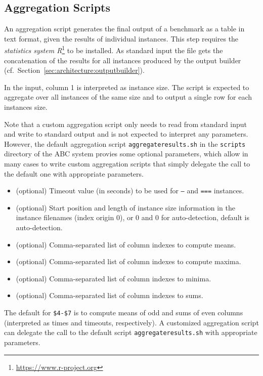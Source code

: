 \documentclass[a4paper]{article}
\newcommand{\abcs}{{ABC}}
\begin{document}
		\subsection{Aggregation Scripts}
		\label{sec:architecture:aggregate}

			An aggregation script
		    generates the final output of a benchmark as a table in text format,
		    given the results of individual instances.
			This step requires the \emph{statistics system R}\footnote{\url{https://www.r-project.org}} to be installed.
		    As standard input the file gets the concatenation of the results for all instances produced by the output builder (cf.~Section~\ref{sec:architecture:outputbuilder}).
	
			In the input, column 1 is interpreted as instance size. The script is expected to aggregate
			over all instances of the same size and to output a single row for each instances size.
	
			Note that a custom aggregation script only needs to read from standard input and write to standard output
			and is not expected to interpret any parameters.
			However,
			the default aggregation script {\tt aggregateresults.sh} in the {\tt scripts} directory of the \abcs{} system
			provies some optional parameters, which allow in many cases to write custom aggregation scripts
			that simply delegate the call to the default one with appropriate parameters.
	
		    \medskip{}
		    \begin{itemize}
				\item[{\tt \$1}:] (optional) Timeout value (in seconds) to be used for {\tt ---} and {\tt ===} instances.
				\item[{\tt \$2},{\tt \$3}:] (optional) Start position and length of instance size information in the instance filenames (index origin $0$),
					or $0$ and $0$ for auto-detection, default is auto-detection.
				\item[{\tt \$4}:] (optional) Comma-separated list of column indexes to compute means.
				\item[{\tt \$5}:] (optional) Comma-separated list of column indexes to compute maxima.
				\item[{\tt \$6}:] (optional) Comma-separated list of column indexes to minima.
				\item[{\tt \$7}:] (optional) Comma-separated list of column indexes to sums.
		    \end{itemize}
	
			The default for {\tt \$4-\$7}
			is to compute means of odd and sums of even columns (interpreted as times and timeouts, respectively).
			A customized aggregation script can delegate the call to the default script {\tt aggregateresults.sh} with appropriate parameters.
\end{document}
